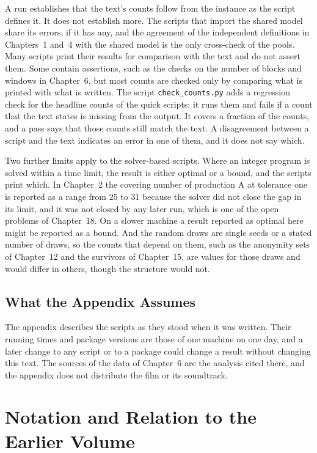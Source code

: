 \documentclass[11pt,twoside,openright]{book}
\theoremstyle{plain}
\theoremstyle{definition}
\theoremstyle{remark}
\begin{document}
A run establishes that the text's counts follow from the instance as the script defines it. It does not establish more. The scripts that import the shared model share its errors, if it has any, and the agreement of the independent definitions in Chapters~1 and~4 with the shared model is the only cross-check of the pools. Many scripts print their results for comparison with the text and do not assert them. Some contain assertions, such as the checks on the number of blocks and windows in Chapter~6, but most counts are checked only by comparing what is printed with what is written. The script \texttt{check\_counts.py} adds a regression check for the headline counts of the quick scripts: it runs them and fails if a count that the text states is missing from the output. It covers a fraction of the counts, and a pass says that those counts still match the text. A disagreement between a script and the text indicates an error in one of them, and it does not say which.

Two further limits apply to the solver-based scripts. Where an integer program is solved within a time limit, the result is either optimal or a bound, and the scripts print which. In Chapter~2 the covering number of production A at tolerance one is reported as a range from $25$ to $31$ because the solver did not close the gap in its limit, and it was not closed by any later run, which is one of the open problems of Chapter~18. On a slower machine a result reported as optimal here might be reported as a bound. And the random draws are single seeds or a stated number of draws, so the counts that depend on them, such as the anonymity sets of Chapter~12 and the survivors of Chapter~15, are values for those draws and would differ in others, though the structure would not.

\section{What the Appendix Assumes}\label{sec:limits-b}

The appendix describes the scripts as they stood when it was written. Their running times and package versions are those of one machine on one day, and a later change to any script or to a package could change a result without changing this text. The sources of the data of Chapter~6 are the analysis cited there, and the appendix does not distribute the film or its soundtrack.

\chapter{Notation and Relation to the Earlier Volume}
\label{app:notation}
\end{document}
